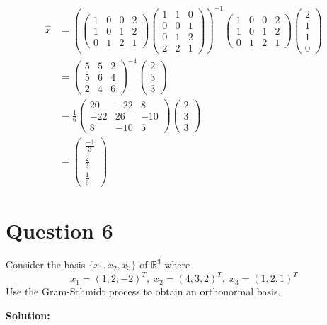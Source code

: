 \documentclass{article}
\begin{document}
\begin{align*}
    \hat{x} &= \left( \begin{pmatrix} 1 & 0 & 0 & 2 \\ 1 & 0 & 1 & 2 \\ 0 & 1 & 2 & 1 \end{pmatrix} \begin{pmatrix} 1 & 1 & 0 \\ 0 & 0 & 1 \\ 0 & 1 & 2 \\ 2 & 2 & 1 \end{pmatrix} \right)^{-1} \begin{pmatrix} 1 & 0 & 0 & 2 \\ 1 & 0 & 1 & 2 \\ 0 & 1 & 2 & 1 \end{pmatrix} \begin{pmatrix} 2 \\ 1 \\ 1 \\ 0 \end{pmatrix} \\
    &= \left( \begin{matrix} 5 & 5 & 2 \\ 5 & 6 & 4 \\ 2 & 4 & 6 \end{matrix} \right)^{-1} \begin{pmatrix} 2 \\ 3 \\ 3 \end{pmatrix} \\
    &= \frac{1}{6} \begin{pmatrix} 20 & -22 & 8 \\ -22 & 26 & -10 \\ 8 & -10 & 5 \end{pmatrix} \begin{pmatrix} 2 \\ 3 \\ 3 \end{pmatrix} \\
    &= \begin{pmatrix} \frac{-1}{3} \\ \frac{2}{3} \\ \frac{1}{6} \end{pmatrix}
\end{align*}

\section*{Question 6}
Consider the basis $\{x_1, x_2, x_3\}$ of $\mathbb{R}^3$ where
$$ x_1 = (1, 2, -2)^T, \; x_2 = (4, 3, 2)^T, \; x_3 = (1, 2, 1)^T $$
Use the Gram-Schmidt process to obtain an orthonormal basis.

\vspace{0.5cm}
\noindent\textbf{Solution:}
\end{document}

